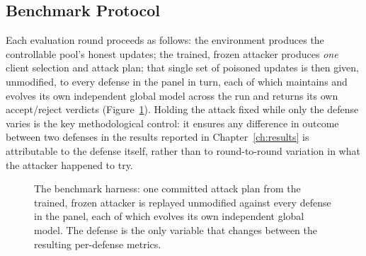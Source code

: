 \subsection{Benchmark Protocol}
Each evaluation round proceeds as follows: the environment produces the controllable pool's honest updates; the trained, frozen attacker produces \emph{one} client selection and attack plan; that single set of poisoned updates is then given, unmodified, to every defense in the panel in turn, each of which maintains and evolves its own independent global model across the run and returns its own accept/reject verdicts (Figure~\ref{fig:benchmark-harness}). Holding the attack fixed while only the defense varies is the key methodological control: it ensures any difference in outcome between two defenses in the results reported in Chapter~\ref{ch:results} is attributable to the defense itself, rather than to round-to-round variation in what the attacker happened to try.

\begin{figure}[h]
\centering
{}
\caption{The benchmark harness: one committed attack plan from the trained, frozen attacker is replayed unmodified against every defense in the panel, each of which evolves its own independent global model. The defense is the only variable that changes between the resulting per-defense metrics.}
\label{fig:benchmark-harness}
\end{figure}

